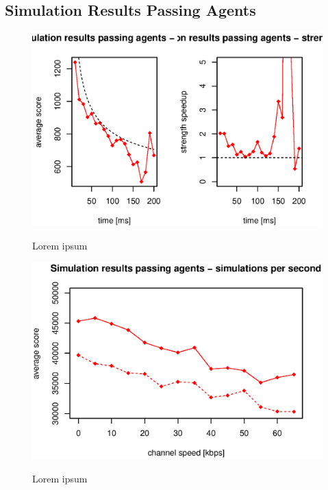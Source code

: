 \subsection{Simulation Results Passing Agents}

\begin{figure}
\begin{center}
\includegraphics{img/simulation-passing-strength.eps}
\end{center}
\caption{\footnotesize Lorem ipsum}{\footnotesize }
\label{fig_simulation_passing_strength}
\end{figure}

\begin{figure}
\begin{center}
\includegraphics{img/simulation-passing-sims-per-sec.eps}
\end{center}
\caption{\footnotesize Lorem ipsum}{\footnotesize }
\label{fig_simulation_passing_sims_per_sec}
\end{figure}

